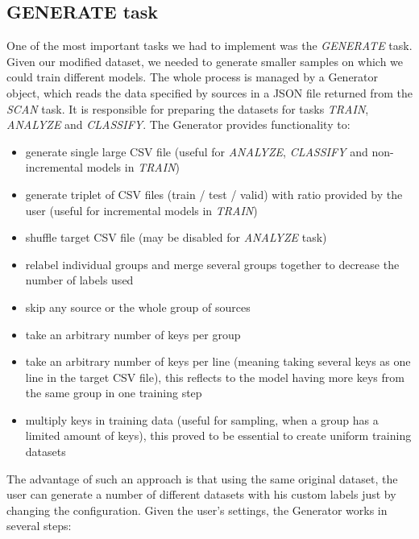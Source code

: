 \subsection{GENERATE task}

One of the most important tasks we had to implement was the \textit{GENERATE} task. Given our modified dataset, we needed to generate smaller samples on which we could train different models. The whole process is managed by a Generator object, which reads the data specified by sources in a JSON file returned from the \textit{SCAN} task. It is responsible for preparing the datasets for tasks \textit{TRAIN}, \textit{ANALYZE} and \textit{CLASSIFY}. The Generator provides functionality to:

\begin{itemize}

\item generate single large CSV file (useful for \textit{ANALYZE}, \textit{CLASSIFY} and non-incremental models in \textit{TRAIN})
\item generate triplet of CSV files (train / test / valid) with ratio provided by the user (useful for incremental models in \textit{TRAIN})
\item shuffle target CSV file (may be disabled for \textit{ANALYZE} task)
\item relabel individual groups and merge several groups together to decrease the number of labels used
\item skip any source or the whole group of sources
\item take an arbitrary number of keys per group
\item take an arbitrary number of keys per line (meaning taking several keys as one line in the target CSV file), this reflects to the model having more keys from the same group in one training step
\item multiply keys in training data (useful for sampling, when a group has a limited amount of keys), this proved to be essential to create uniform training datasets

\end{itemize}

The advantage of such an approach is that using the same original dataset, the user can generate a number of different datasets with his custom labels just by changing the configuration. Given the user's settings, the Generator works in several steps:

